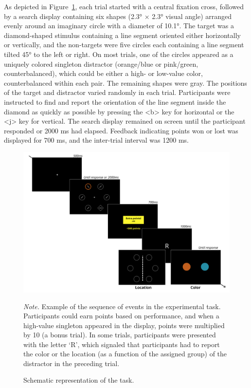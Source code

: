 \documentclass[
  man,
  floatsintext,
  longtable,
  nolmodern,
  notxfonts,
  notimes,
  mask,
  colorlinks=true,linkcolor=blue,citecolor=blue,urlcolor=blue]{apa7}
\begin{document}
As depicted in Figure~\ref{fig-1}, each trial started with a central
fixation cross, followed by a search display containing six shapes (2.3°
× 2.3° visual angle) arranged evenly around an imaginary circle with a
diameter of 10.1°. The target was a diamond-shaped stimulus containing a
line segment oriented either horizontally or vertically, and the
non-targets were five circles each containing a line segment tilted 45°
to the left or right. On most trials, one of the circles appeared as a
uniquely colored singleton distractor (orange/blue or pink/green,
counterbalanced), which could be either a high- or low-value color,
counterbalanced within each pair. The remaining shapes were gray. The
positions of the target and distractor varied randomly in each trial.
Participants were instructed to find and report the orientation of the
line segment inside the diamond as quickly as possible by pressing the
\textless b\textgreater{} key for horizontal or the
\textless j\textgreater{} key for vertical. The search display remained
on screen until the participant responded or 2000 ms had elapsed.
Feedback indicating points won or lost was displayed for 700 ms, and the
inter-trial interval was 1200 ms.

\begin{figure}[htpb]

{\caption{{Schematic representation of the task.}{\label{fig-1}}}}

\begin{center}
\includegraphics[width=4.92in,height=\textheight,keepaspectratio]{pre_registation/figure_3.png}
\end{center}

{\noindent \emph{Note.} Example of the sequence of events in the
experimental task. Participants could earn points based on performance,
and when a high-value singleton appeared in the display, points were
multiplied by 10 (a bonus trial). In some trials, participants were
presented with the letter `R', which signaled that participants had to
report the color or the location (as a function of the assigned group)
of the distractor in the preceding trial.}

\end{figure}
\end{document}
